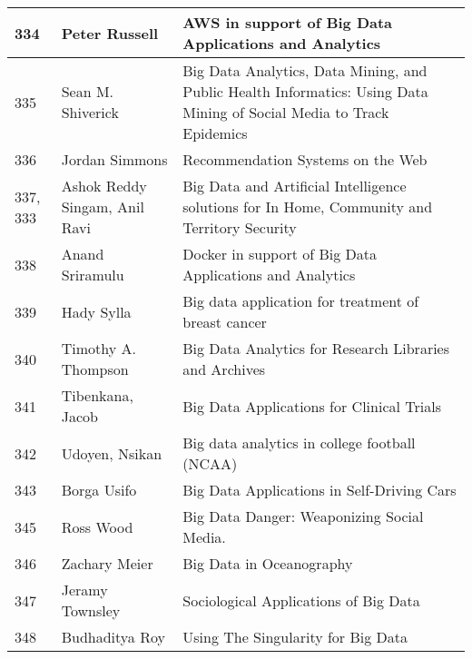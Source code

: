 \documentclass[12pt]{book}
\begin{document}
\begin{footnotesize}
\begin{longtable}{|p{1cm}p{5cm}p{9cm}|}
\hline
334 & Peter Russell & AWS in support of Big Data Applications and Analytics  \\
\hline
335 & Sean M. Shiverick & Big Data Analytics, Data Mining, and Public Health Informatics: Using Data Mining of Social Media to Track Epidemics
  \\
\hline
336 & Jordan Simmons & Recommendation Systems on the Web  \\
\hline
337, 333 & Ashok Reddy Singam, Anil Ravi & Big Data and Artificial Intelligence solutions for In Home, Community and Territory Security
  \\
\hline
338 & Anand Sriramulu & Docker in support of Big Data Applications and Analytics  \\
\hline
339 & Hady Sylla & Big data application for treatment of breast cancer  \\
\hline
340 & Timothy A. Thompson & Big Data Analytics for Research Libraries and Archives  \\
\hline
341 & Tibenkana, Jacob & Big Data Applications for Clinical Trials  \\
\hline
342 & Udoyen, Nsikan & Big data analytics in college football (NCAA)  \\
\hline
343 & Borga Usifo & Big Data Applications in Self-Driving Cars  \\
\hline
345 & Ross Wood & Big Data Danger: Weaponizing Social Media.  \\
\hline
346 & Zachary Meier & Big Data in Oceanography  \\
\hline
347 & Jeramy Townsley & Sociological Applications of Big Data  \\
\hline
348 & Budhaditya Roy & Using The Singularity for Big Data  \\
\hline
\end{longtable}
\end{footnotesize}
\newpage
\end{document}
